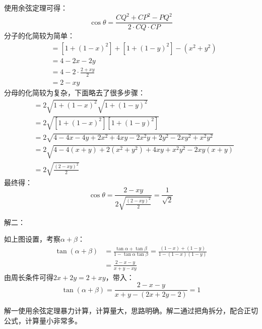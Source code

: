 使用余弦定理可得：
\[
\cos \theta =\frac{CQ^2+CP^2-PQ^2}{2\cdot CQ\cdot CP}
\]
分子的化简较为简单：
\begin{align*}
&=\left[ 1+\left( 1-x \right) ^2 \right] +\left[ 1+\left( 1-y \right) ^2 \right] -\left( x^2+y^2 \right) \\
&=4-2x-2y \\
&=4-2\cdot \frac{2+xy}{2} \\
&=2-xy
\end{align*}
分母的化简较为复杂，下面略去了很多步骤：
\begin{align*}
&=2\sqrt{1+\left( 1-x \right) ^2}\sqrt{1+\left( 1-y \right) ^2} \\
&=2\sqrt{\left[ 1+\left( 1-x \right) ^2 \right] \left[ 1+\left( 1-y \right) ^2 \right]} \\
&=2\sqrt{4-4x-4y+2x^2+4xy-2x^2y+2y^2-2xy^2+x^2y^2} \\
&=2\sqrt{4-4\left( x+y \right) +2\left( x^2+y^2 \right) +4xy+x^2y^2-2xy\left( x+y \right)} \\
&=2\sqrt{\frac{\left( 2-xy \right) ^2}{2}}
\end{align*}
最终得：
\[
\cos \theta =\frac{2-xy}{2\sqrt{\frac{\left( 2-xy \right) ^2}{2}}}=\frac{1}{\sqrt{2}}
\]

解二：

\begin{figure}[h]
\centering
{}
\end{figure}

如上图设置，考察$\alpha +\beta$：
\begin{align*}
\tan \left( \alpha +\beta \right) &=\frac{\tan \alpha +\tan \beta}{1-\tan \alpha \tan \beta}=\frac{\left( 1-x \right) +\left( 1-y \right)}{1-\left( 1-x \right) \left( 1-y \right)} \\
&=\frac{2-x-y}{x+y-xy}
\end{align*}
由周长条件可得$2x+2y=2+xy$，带入：
\[
\tan \left( \alpha +\beta \right) =\frac{2-x-y}{x+y-\left( 2x+2y-2 \right)}=1
\]

\begin{tcolorbox}
解一使用余弦定理暴力计算，计算量大，思路明确。解二通过把角拆分，配合正切公式，计算量小非常多。
\end{tcolorbox}




